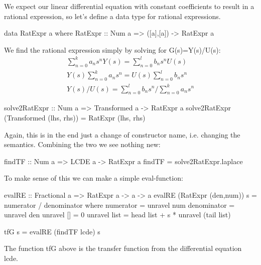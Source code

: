 We expect our linear differential equation with constant coefficients to result
in a rational expression, so let's define a data type for rational expressions.

\begin{code}
data RatExpr a where
  RatExpr :: Num a => ([a],[a]) -> RatExpr a
\end{code}

We find the rational expression simply by solving for G(s)=Y(s)/U(s):
\begin{gather}
\sum\limits^{k}_{n=0}{a_n s^n Y(s)} = \sum\limits^{l}_{n=0}{b_n s^n U(s)}\\
Y(s)\sum\limits^{k}_{n=0}{a_n s^n} = U(s)\sum\limits^{l}_{n=0}{b_n s^n}\\
Y(s)/U(s) = \sum\limits^{l}_{n=0}{b_n s^n}/\sum\limits^{k}_{n=0}{a_n s^n}
\end{gather}

\begin{code}
solve2RatExpr :: Num a => Transformed a -> RatExpr a
solve2RatExpr (Transformed (lhs, rhs)) = RatExpr (lhs, rhs)
\end{code}

Again, this is in the end just a change of constructor name, i.e. changing the %
semantics. Combining the two we see nothing new:

\begin{code}
findTF :: Num a => LCDE a -> RatExpr a
findTF = solve2RatExpr.laplace
\end{code}

To make sense of this we can make a simple eval-function:

\begin{code}
evalRE :: Fractional a => RatExpr a -> a -> a
evalRE (RatExpr (den,num)) s = numerator / denominator where
  numerator   = unravel num
  denominator = unravel den
  unravel []   = 0
  unravel list = head list + s * unravel (tail list)

tfG s = evalRE (findTF lcde) s
\end{code}

The function tfG above is the transfer function from the differential equation lcde.


